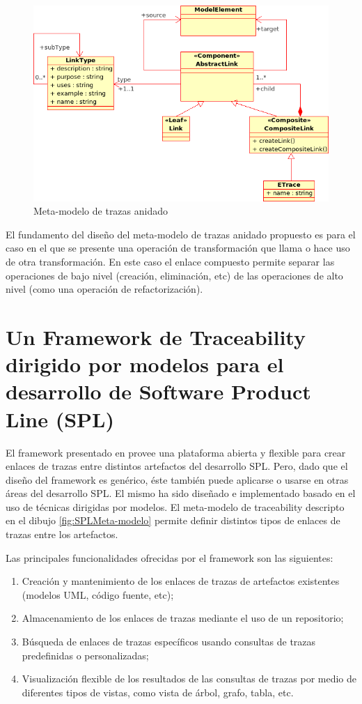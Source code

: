 \documentclass[a4paper,12pt,oneside]{book}
\begin{document}
\begin{figure}[hbtp]
\centering
\includegraphics[scale=0.6]{./img/NestedTraceMetamodel}
\caption{Meta-modelo de trazas anidado}
\label{fig:ETraceToolMeta-modelo}
\end{figure}

El fundamento del diseño del meta-modelo de trazas anidado propuesto es para el caso en el que se presente una operación de transformación que llama o hace uso de otra transformación. En este caso el enlace compuesto permite separar las operaciones de bajo nivel (creación, eliminación, etc) de las operaciones de alto nivel (como una operación de refactorización).

\section{Un Framework  de Traceability dirigido por modelos para el desarrollo de Software Product Line (SPL)}

El framework presentado en \cite{SousaKuleszaRummlerAnquetilMitschkeMoreiraAmaralAraujo}  provee una plataforma abierta y flexible para crear enlaces de trazas entre distintos artefactos del desarrollo SPL. Pero, dado que el diseño del framework es genérico, éste también puede aplicarse o usarse en otras áreas del desarrollo SPL. El mismo ha sido diseñado e implementado basado en el uso de técnicas dirigidas por modelos. El meta-modelo de traceability descripto en el dibujo \ref{fig:SPLMeta-modelo} permite definir distintos tipos de enlaces de trazas entre los artefactos.

Las principales funcionalidades ofrecidas por el framework son las siguientes:

\begin{enumerate}
\item     Creación y mantenimiento de los enlaces de trazas de artefactos existentes (modelos UML, código fuente, etc);
\item    Almacenamiento de los enlaces de trazas mediante el uso de un repositorio;
\item    Búsqueda de enlaces de trazas específicos usando consultas de trazas predefinidas o personalizadas;
\item    Visualización flexible de los resultados de las consultas de trazas por medio de diferentes tipos de vistas, como vista de árbol, grafo, tabla, etc.
\end{enumerate}
\end{document}
